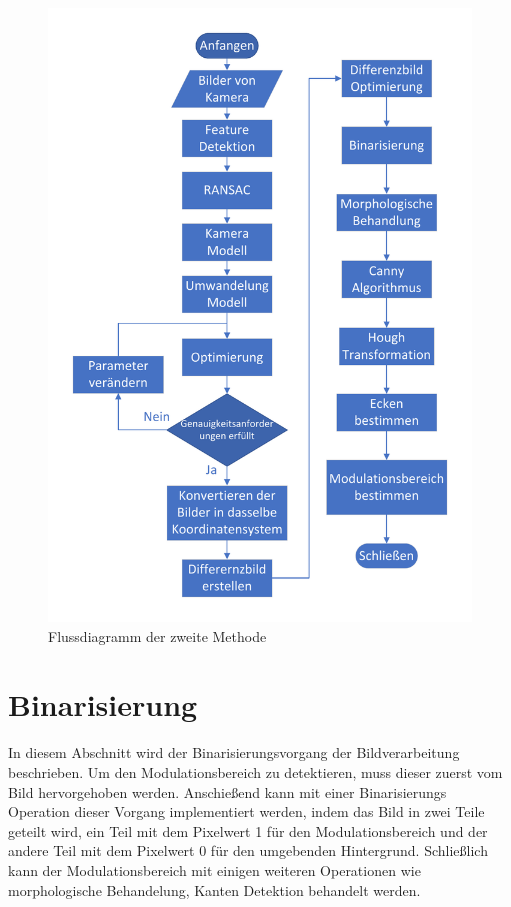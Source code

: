 \begin{figure}[H]
 \centering 
 \includegraphics[keepaspectratio,width=1.0\textwidth]{images/4_ZweiteErfahrung/Flussdiagrammsum.pdf}
 \caption{Flussdiagramm der zweite Methode}
 \label{fig:Flussdiagramm der zweite Methode}
\end{figure}

\section{Binarisierung}

In diesem Abschnitt wird der Binarisierungsvorgang der Bildverarbeitung beschrieben. Um den Modulationsbereich zu detektieren, muss dieser zuerst vom Bild hervorgehoben werden. Anschießend kann mit einer Binarisierungs Operation dieser Vorgang implementiert werden, indem das Bild in zwei Teile geteilt wird, ein Teil mit dem Pixelwert 1 für den Modulationsbereich und der andere Teil mit dem Pixelwert 0 für den umgebenden Hintergrund. Schließlich kann der Modulationsbereich mit einigen weiteren Operationen wie morphologische Behandelung, Kanten Detektion behandelt werden.

